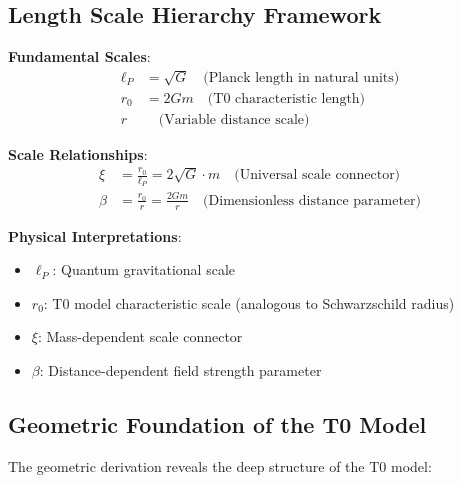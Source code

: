 \documentclass[12pt,a4paper]{article}
\begin{document}
\subsection{Length Scale Hierarchy Framework}
\label{subsec:length_scale_framework}

\begin{tcolorbox}[colback=blue!5!white,colframe=blue!75!black,title=Complete T0 Length Scale Hierarchy]
	
	\textbf{Fundamental Scales}:
	\begin{align}
		\ell_P &= \sqrt{G} \quad \text{(Planck length in natural units)} \\
		r_0 &= 2Gm \quad \text{(T0 characteristic length)} \\
		r &\quad \text{(Variable distance scale)}
	\end{align}
	
	\textbf{Scale Relationships}:
	\begin{align}
		\xi &= \frac{r_0}{\ell_P} = 2\sqrt{G} \cdot m \quad \text{(Universal scale connector)} \\
		\beta &= \frac{r_0}{r} = \frac{2Gm}{r} \quad \text{(Dimensionless distance parameter)}
	\end{align}
	
	\textbf{Physical Interpretations}:
	\begin{itemize}
		\item $\ell_P$: Quantum gravitational scale
		\item $r_0$: T0 model characteristic scale (analogous to Schwarzschild radius)
		\item $\xi$: Mass-dependent scale connector
		\item $\beta$: Distance-dependent field strength parameter
	\end{itemize}
	
\end{tcolorbox}

\subsection{Geometric Foundation of the T0 Model}
\label{subsec:geometric_foundation}

The geometric derivation reveals the deep structure of the T0 model:
\end{document}
